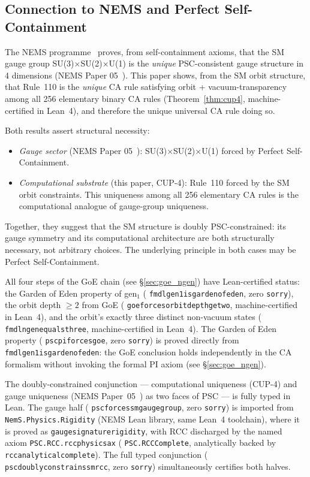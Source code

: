 \documentclass[11pt]{article}
\theoremstyle{remark}
\newcommand{\lean}[1]{%
  \penalty-100
  \begingroup\def\_{\textunderscore\allowbreak}\texttt{#1}\endgroup}
\begin{document}
\subsection{Connection to NEMS and Perfect Self-Containment}

The NEMS programme~\cite{SpivackUGP2024} proves, from self-containment axioms, that the
SM gauge group SU(3)$\times$SU(2)$\times$U(1) is the \emph{unique} PSC-consistent gauge
structure in 4 dimensions (NEMS Paper 05~\cite{SpivackUGP2024}). This paper shows, from the SM orbit structure,
that Rule~110 is the \emph{unique} CA rule satisfying orbit + vacuum-transparency among
all 256 elementary binary CA rules (Theorem~\ref{thm:cup4}, machine-certified in Lean~4), and therefore
the unique universal CA rule doing so.

Both results assert structural necessity:
\begin{itemize}
\item \emph{Gauge sector} (NEMS Paper 05~\cite{SpivackUGP2024}): SU(3)$\times$SU(2)$\times$U(1) forced by
  Perfect Self-Containment.
\item \emph{Computational substrate} (this paper, CUP-4): Rule~110 forced by the SM
  orbit constraints. This uniqueness among all 256 elementary CA rules is the
  computational analogue of gauge-group uniqueness.
\end{itemize}
Together, they suggest that the SM structure is doubly PSC-constrained: its gauge symmetry
and its computational architecture are both structurally necessary, not arbitrary choices.
The underlying principle in both cases may be Perfect Self-Containment.

All four steps of the GoE chain (see \S\ref{sec:goe_ngen}) have Lean-certified
status: the Garden of Eden property of gen$_1$
(\lean{fmdl\_gen1\_is\_garden\_of\_eden}, zero \texttt{sorry}), the orbit depth $\geq 2$ from GoE
(\lean{goe\_forces\_orbit\_depth\_ge\_two}, machine-certified in Lean~4), and the orbit's exactly three
distinct non-vacuum states (\lean{fmdl\_ngen\_equals\_three}, machine-certified in Lean~4).
The Garden of Eden property (\lean{psc\_pi\_forces\_goe}, zero \texttt{sorry}) is proved directly from \lean{fmdl\_gen1\_is\_garden\_of\_eden}:
the GoE conclusion holds independently in the CA formalism without invoking the formal
PI axiom (see \S\ref{sec:goe_ngen}).

The doubly-constrained conjunction --- computational uniqueness (CUP-4) and gauge
uniqueness (NEMS Paper~05~\cite{SpivackUGP2024}) as two faces of PSC --- is fully typed in Lean.
The gauge half (\lean{psc\_forces\_sm\_gauge\_group}, zero \texttt{sorry})
is imported from \lean{NemS.Physics.Rigidity} (NEMS Lean library, same Lean~4
toolchain), where it is proved as \lean{gauge\_signature\_rigidity},
with RCC discharged by the named axiom \lean{PSC.RCC.rcc\_physics\_ax}
(\lean{PSC.RCCComplete}, analytically backed by \lean{rcc\_analytical\_complete}).
The full typed conjunction (\lean{psc\_doubly\_constrains\_sm\_rcc}, zero \texttt{sorry}) simultaneously certifies both halves.
\end{document}
